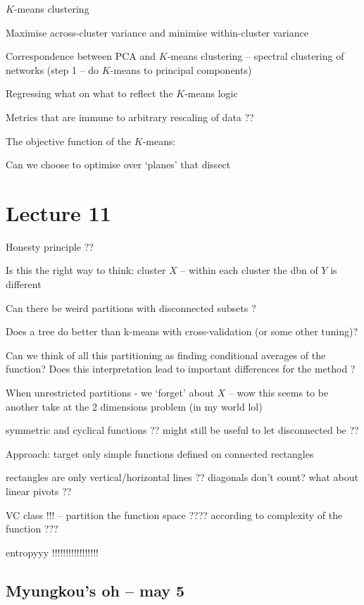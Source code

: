 \documentclass[a4paper,12pt,twoside]{article}
\begin{document}
$K$-means clustering

Maximise across-cluster variance and minimise within-cluster variance

Correspondence between PCA and $K$-means clustering -- spectral clustering of networks (step 1 -- do $K$-means to principal components)

Regressing what on what to reflect the $K$-means logic

Metrics that are immune to arbitrary rescaling of data ??

The objective function of the $K$-means:



Can we choose to optimise over `planes' that dissect



\section*{Lecture 11}

Honesty principle ??

Is this the right way to think: cluster $X$ -- within each cluster the dbn of $Y$ is different

Can there be weird partitions with disconnected subsets ?

Does a tree do better than k-means with cross-validation (or some other tuning)?


Can we think of all this partitioning as finding conditional averages of the function?
Does this interpretation lead to important differences for the method ?



When unrestricted partitions - we `forget' about $X$ -- wow this seems to be another take at the 2 dimensions problem (in my world lol)

symmetric and cyclical functions ?? might still be useful to let disconnected be ??


Approach: target only simple functions defined on connected rectangles

rectangles are only vertical/horizontal lines ?? diagonals don't count? what about linear pivots ??


VC class !!! -- partition the function space ???? according to complexity of the function ???

entropyyy !!!!!!!!!!!!!!!!!


\subsection*{Myungkou's oh -- may 5}
\end{document}
